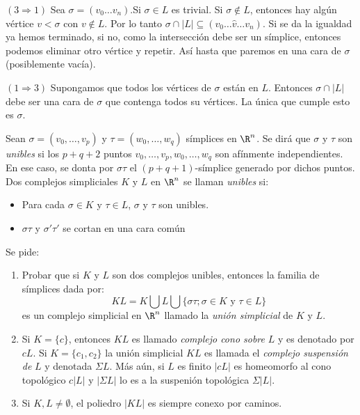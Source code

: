 \documentclass[twoside]{article}
\begin{document}
\begin{solucion}
$(3\Rightarrow 1)$ Sea $\sigma=(v_0\dots v_n)$.Si $\sigma\in L$ es trivial. Si $\sigma\notin L$, entonces hay algún vértice $v<\sigma$ con $v\notin L$. Por lo tanto $\sigma\cap|L|\subseteq (v_0\dots \hat{v}\dots v_n)$. Si se da la igualdad ya hemos terminado, si no, como la intersección debe ser un símplice, entonces podemos eliminar otro vértice y repetir. Así hasta que paremos en una cara de $\sigma$ (posiblemente vacía).

$(1\Rightarrow 3)$ Supongamos que todos los vértices de $\sigma$ están en $L$. Entonces $\sigma\cap |L|$ debe ser una cara de $\sigma$ que contenga todos su vértices. La única que cumple esto es $\sigma$.
\end{solucion}

\newpage

\begin{ejercicio}{1.2}
Sean $σ = (v_0,\dots,v_p)$ y $τ = (w_0,\dots,w_q)$ símplices en $\R^n$.
Se dirá que $σ$ y $τ$ son \emph{unibles} si los $p+q+2$ puntos $v_0,\dots,v_p,w_0,\dots,w_q$ son afínmente independientes.
En ese caso, se donta por $στ$ el $(p+q+1)$-símplice generado por dichos puntos.
Dos complejos simpliciales $K$ y $L$ en $\R^n$ se llaman \emph{unibles} si:
\begin{itemize}
\item Para cada $σ \in K$ y $τ \in L$, $σ$ y $τ$ son unibles.
\item $στ$ y $σ'τ'$ se cortan en una cara común
\end{itemize}
Se pide:
\begin{enumerate}
\item Probar que si $K$ y $L$ son dos complejos unibles, entonces la familia de símplices dada por:
\[ KL = K \bigcup L \bigcup \{στ; σ \in K \text{ y }τ \in L\} \]
es un complejo simplicial en $\R^n$ llamado la \emph{unión simplicial} de $K$ y $L$.
\item Si $K = \{c\}$, entonces $KL$ es llamado \emph{complejo cono sobre} $L$ y es denotado por $cL$.
Si $K = \{c_1,c_2\}$ la unión simplicial $KL$ es llamada el \emph{complejo suspensión de} $L$ y denotada $ΣL$.
Más aún, si $L$ es finito $|cL|$ es homeomorfo al cono topológico $c|L|$ y $|ΣL|$ lo es a la suspenión topológica $Σ|L|$.
\item Si $K, L \neq \emptyset$, el poliedro $|KL|$ es siempre conexo por caminos.
\end{enumerate}
\end{ejercicio}
\begin{solucion}
\end{solucion}
\end{document}
